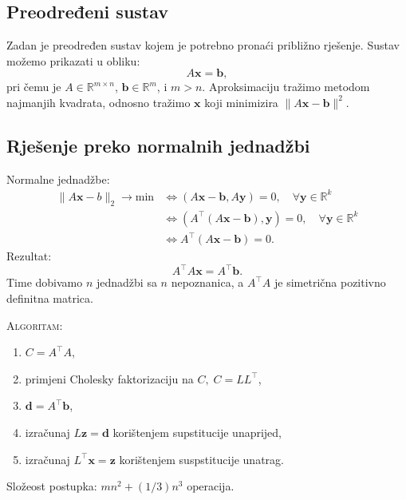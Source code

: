 \documentclass{article}
\begin{document}
\subsection{Preodređeni sustav}
Zadan je preodređen sustav kojem je potrebno pronaći približno rješenje. Sustav možemo prikazati u obliku:
\begin{equation}
A\mathbf x = \mathbf b,
\label{eq:osnovni_sus}
\end{equation}
pri čemu je $A \in \mathbb R^{m \times n}$, $\mathbf b \in \mathbb R^m$, i $m>n$. Aproksimaciju tražimo metodom najmanjih kvadrata, odnosno tražimo $\mathbf x$ koji minimizira $\| A\mathbf x - \mathbf b\|^2$.

\subsection{Rješenje preko normalnih jednadžbi}
Normalne jednadžbe:
\begin{align}
\|A\mathbf x - b\|_2 \rightarrow \text{min} &\Leftrightarrow \left (A\mathbf x - \mathbf b, A\mathbf y \right ) = 0,\quad \forall\mathbf y \in \mathbb R^k\\
&\Leftrightarrow \left(A^\top\left(A\mathbf x - \mathbf b\right ), \mathbf y \right ) = 0,\quad \forall\mathbf y \in \mathbb R^k\\
&\Leftrightarrow A^\top \left ( A \mathbf x - \mathbf b \right ) = 0.
\label{eq:normalne}
\end{align}
Rezultat:
$$A^\top A\mathbf x = A^\top \mathbf b.$$
Time dobivamo $n$ jednadžbi sa $n$ nepoznanica, a $A^\top A$ je simetrična pozitivno definitna matrica.

\textsc{Algoritam:}
\begin{enumerate}[\indent 1)]
  \item $C = A^\top A$,
  \item primjeni Cholesky faktorizaciju na $C,\; C = LL^\top$,
  \item $\mathbf d = A^\top \mathbf b$,
  \item izračunaj $L\mathbf z = \mathbf d$ korištenjem supstitucije unaprijed,
  \item izračunaj $L^\top \mathbf x = \mathbf z$ korištenjem suspstitucije unatrag.
\end{enumerate}
Složeost postupka: $mn^2 + (1/3)n^3$ operacija.
\end{document}
